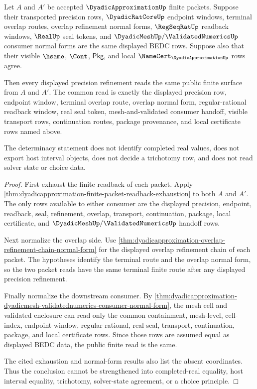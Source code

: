\begin{theorem}
\label{thm:dyadicapproximation-refined-finite-packet-readback-determinacy}
Let $A$ and $A'$ be accepted $\DyadicApproximationUp$ finite packets. Suppose
their transported precision rows, $\DyadicRatCoreUp$ endpoint windows,
terminal overlap routes, overlap refinement normal forms,
$\RegSeqRatUp$ readback windows, $\RealUp$ seal tokens, and
$\DyadicMeshUp/\ValidatedNumericsUp$ consumer normal forms are the same
displayed BEDC rows. Suppose also that their visible $\hsame$, $\Cont$,
$\mathsf{Pkg}$, and local $\NameCert_{\DyadicApproximationUp}$ rows agree.

Then every displayed precision refinement reads the same public finite
surface from $A$ and $A'$. The common read is exactly the displayed precision
row, endpoint window, terminal overlap route, overlap normal form,
regular-rational readback window, real seal token, mesh-and-validated consumer
handoff, visible transport rows, continuation routes, package provenance, and
local certificate rows named above.

The determinacy statement does not identify completed real values, does not
export host interval objects, does not decide a trichotomy row, and does not
read solver state or choice data.
\end{theorem}
\begin{proof}
First exhaust the finite readback of each packet. Apply
\autoref{thm:dyadicapproximation-finite-packet-readback-exhaustion} to both
$A$ and $A'$. The only rows available to either consumer are the displayed
precision, endpoint, readback, seal, refinement, overlap, transport,
continuation, package, local certificate, and
$\DyadicMeshUp/\ValidatedNumericsUp$ handoff rows.

Next normalize the overlap side. Use
\autoref{thm:dyadicapproximation-overlap-refinement-chain-normal-form} for the
displayed overlap refinement chain of each packet. The hypotheses identify the
terminal route and the overlap normal form, so the two packet reads have the
same terminal finite route after any displayed precision refinement.

Finally normalize the downstream consumer. By
\autoref{thm:dyadicapproximation-dyadicmesh-validatednumerics-consumer-normal-form},
the mesh cell and validated enclosure can read only the common containment,
mesh-level, cell-index, endpoint-window, regular-rational, real-seal,
transport, continuation, package, and local certificate rows. Since those rows
are assumed equal as displayed BEDC data, the public finite read is the same.

The cited exhaustion and normal-form results also list the absent coordinates.
Thus the conclusion cannot be strengthened into completed-real equality, host
interval equality, trichotomy, solver-state agreement, or a choice principle.
\end{proof}
